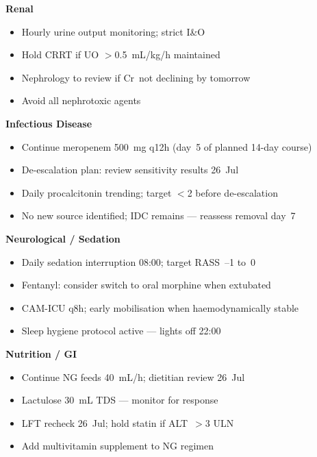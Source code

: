 \documentclass[11pt,a4paper]{scrartcl}
\begin{document}
\begin{tcolorbox}[planbox, title={\faPen\enspace Assessment \& Plan — Dr.\ Sandra Osei-Bonsu}]
\begin{minipage}[t]{0.47\linewidth}
    \vspace{4pt}
    \textbf{\color{MedMid}Renal}\par
    \begin{itemize}[leftmargin=12pt, itemsep=1pt, topsep=2pt]
      \item Hourly urine output monitoring; strict I\&O
      \item Hold CRRT if UO $>$0.5~mL/kg/h maintained
      \item Nephrology to review if Cr~not declining by tomorrow
      \item Avoid all nephrotoxic agents
    \end{itemize}
  \end{minipage}\hfill
  \begin{minipage}[t]{0.47\linewidth}
    \textbf{\color{MedMid}Infectious Disease}\par
    \begin{itemize}[leftmargin=12pt, itemsep=1pt, topsep=2pt]
      \item Continue meropenem 500~mg q12h (day~5 of planned 14-day course)
      \item De-escalation plan: review sensitivity results 26~Jul
      \item Daily procalcitonin trending; target $<$2 before de-escalation
      \item No new source identified; IDC remains — reassess removal day~7
    \end{itemize}

    \vspace{4pt}
    \textbf{\color{MedMid}Neurological / Sedation}\par
    \begin{itemize}[leftmargin=12pt, itemsep=1pt, topsep=2pt]
      \item Daily sedation interruption 08:00; target RASS~--1 to~0
      \item Fentanyl: consider switch to oral morphine when extubated
      \item CAM-ICU q8h; early mobilisation when haemodynamically stable
      \item Sleep hygiene protocol active — lights off 22:00
    \end{itemize}

    \vspace{4pt}
    \textbf{\color{MedMid}Nutrition / GI}\par
    \begin{itemize}[leftmargin=12pt, itemsep=1pt, topsep=2pt]
      \item Continue NG feeds 40~mL/h; dietitian review 26~Jul
      \item Lactulose 30~mL TDS — monitor for response
      \item LFT recheck 26~Jul; hold statin if ALT~$>$3\texttimes{} ULN
      \item Add multivitamin supplement to NG regimen
    \end{itemize}


\end{minipage}
\end{tcolorbox}
\end{document}

